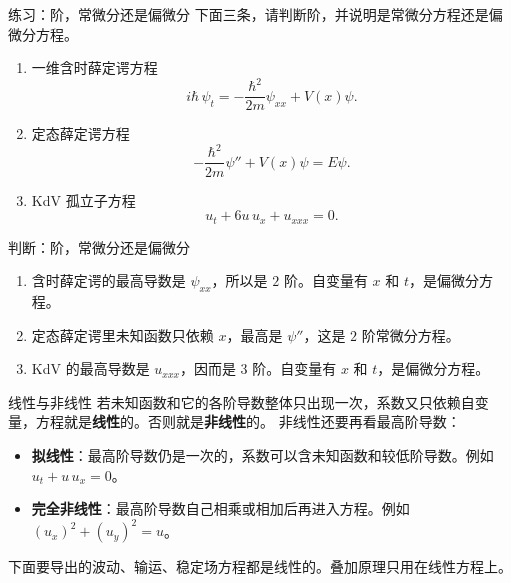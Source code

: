 \documentclass[fontset=windows, chinese, 10pt, xcolor=dvipsnames]{beamer}
\begin{document}
\begin{frame}{练习：阶，常微分还是偏微分}
  下面三条，请判断阶，并说明是常微分方程还是偏微分方程。
  \vspace{0.4em}
  \begin{enumerate}
    \item 一维含时薛定谔方程
      \begin{equation*}
        i\hbar\,\psi_t=-\frac{\hbar^2}{2m}\psi_{xx}+V(x)\psi.
      \end{equation*}
    \item 定态薛定谔方程
      \begin{equation*}
        -\frac{\hbar^2}{2m}\psi''+V(x)\psi=E\psi.
      \end{equation*}
    \item KdV 孤立子方程
      \begin{equation*}
        u_t+6u\,u_x+u_{xxx}=0.
      \end{equation*}
  \end{enumerate}
\end{frame}

\begin{frame}{判断：阶，常微分还是偏微分}
  \begin{enumerate}
    \item 含时薛定谔的最高导数是 $\psi_{xx}$，所以是 $2$ 阶。自变量有 $x$ 和 $t$，是偏微分方程。
    \item 定态薛定谔里未知函数只依赖 $x$，最高是 $\psi''$，这是 $2$ 阶常微分方程。
    \item KdV 的最高导数是 $u_{xxx}$，因而是 $3$ 阶。自变量有 $x$ 和 $t$，是偏微分方程。
  \end{enumerate}
  \vspace{0.3em}
\end{frame}

\begin{frame}{线性与非线性}
  若未知函数和它的各阶导数整体只出现一次，系数又只依赖自变量，方程就是\textbf{线性}的。否则就是\textbf{非线性}的。
  \vspace{0.35em}
  非线性还要再看最高阶导数：
  \begin{itemize}
    \item \textbf{拟线性}：最高阶导数仍是一次的，系数可以含未知函数和较低阶导数。例如 $u_t+u\,u_x=0$。
    \item \textbf{完全非线性}：最高阶导数自己相乘或相加后再进入方程。例如 $(u_x)^2+(u_y)^2=u$。
  \end{itemize}
  \vspace{0.25em}
  下面要导出的波动、输运、稳定场方程都是线性的。叠加原理只用在线性方程上。
\end{frame}
\end{document}
